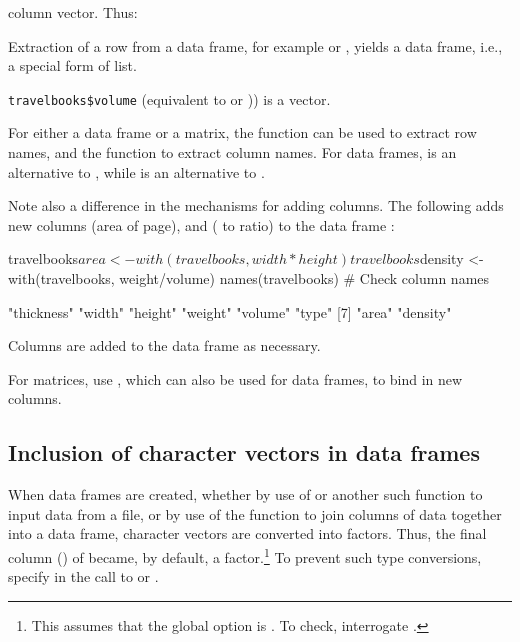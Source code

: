 \begin{itemizz}
column vector.  Thus:
\begin{itemizz}
\item
{}
Extraction of a row from a data frame, for example
  or , yields a data frame,
  i.e., a special form of list.
\item \verb!travelbooks$volume! (equivalent to 
or )) is a vector.
\end{itemizz}
\item For either a data frame or a matrix, the function
 can be used to extract row names, and the
function  to extract column names.  For
data frames,  is an alternative to
, while  is an alternative to
.
\end{itemizz}

Note also a difference in the mechanisms for adding columns.  The
following adds new columns  (area of page), and
 ( to  ratio) to the data
frame :
\begin{Schunk}
\begin{Sinput}
travelbooks$area <- with(travelbooks, width*height)
travelbooks$density <- with(travelbooks,
                            weight/volume)
names(travelbooks)   # Check column names
\end{Sinput}
\begin{Soutput}
[1] "thickness" "width"     "height"    "weight"    "volume"    "type"     
[7] "area"      "density"  
\end{Soutput}
\end{Schunk}
Columns are added to the data frame as necessary.

For matrices, use , which can also be used for data
frames, to bind in new columns.
\enlargethispage{12pt}

\subsection{Inclusion of character vectors in data frames}
When data frames are created, whether by use of
 or another such function to input data from a
file, or by use of the function  to
join columns of data together into a data frame, character vectors are
converted into factors.  Thus, the final column () of
 became, by default, a factor.\footnote{This assumes
that the global option  is .
To check, interrogate {\footnotesize {}.}}
To prevent such type conversions, specify 
in the call to  or .

